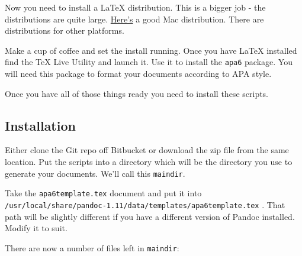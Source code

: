 Now you need to install a LaTeX distribution. This is a bigger job - the
distributions are quite large. \href{http://tug.org/mactex/}{Here's} a
good Mac distribution. There are distributions for other platforms.

Make a cup of coffee and set the install running. Once you have LaTeX
installed find the TeX Live Utility and launch it. Use it to install the
\texttt{apa6} package. You will need this package to format your
documents according to APA style.

Once you have all of those things ready you need to install these
scripts.

\subsection{Installation}\label{installation}

Either clone the Git repo off Bitbucket or download the zip file from
the same location. Put the scripts into a directory which will be the
directory you use to generate your documents. We'll call this
\texttt{maindir}.

Take the \texttt{apa6template.tex} document and put it into
\texttt{/usr/local/share/pandoc-1.11/data/templates/apa6template.tex} .
That path will be slightly different if you have a different version of
Pandoc installed. Modify it to suit.

There are now a number of files left in \texttt{maindir}:

